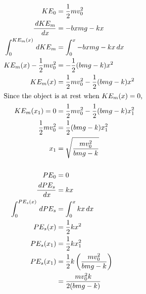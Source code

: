 \documentclass{esg8012pset}
\renewcommand{\d}{\,d}
\begin{document}
\begin{solution}

\begin{align*}
  KE_0 & = \frac{1}{2}m v_0^2 \\
  \frac{\d KE_m}{\d x} & = -bx m g - kx \\
  \int_0^{KE_m(x)} \d{KE_m} & = \int_0^x {-bx m g - kx}\d x \\
  KE_m(x) - \frac{1}{2}m v_0^2 & = -\frac{1}{2}(b m g - k)x^2 \\
  KE_m(x) & = \frac{1}{2}m v_0^2 - \frac{1}{2}(b m g - k)x^2 \\
  \intertext{Since the object is at rest when $KE_m(x) = 0$,}
  KE_m(x_1) = 0 & = \frac{1}{2}m v_0^2 - \frac{1}{2}(b m g - k)x_1^2 \\
  \frac{1}{2}m v_0^2 & = \frac{1}{2}(b m g - k)x_1^2 \\
  x_1 & = \sqrt{\frac{m v_0^2}{b m g - k}} \\
  \\
  PE_0 & = 0 \\
  \frac{\d PE_s}{\d x} & = k x \\
  \int_0^{PE_s(x)} \d{PE_s} & = \int_0^x k x \d x \\
  PE_s(x) & = \frac{1}{2}k x^2 \\
  PE_s(x_1) & = \frac{1}{2}k x_1^2 \\
  PE_s(x_1) & = \frac{1}{2} k \left(\frac{m v_0^2}{b m g - k}\right) \\
   & = \frac{m v_0^2 k}{2(b m g - k)}
\end{align*}
\end{solution}
\end{document}
